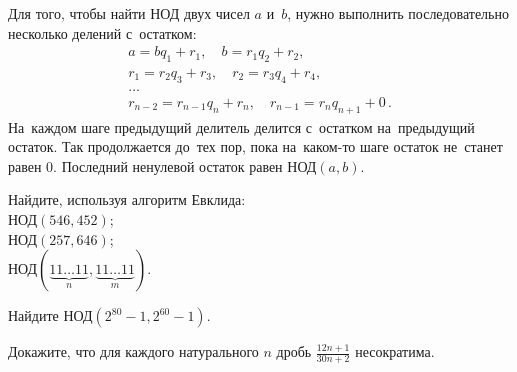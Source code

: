 Для того, чтобы найти НОД двух чисел $a$ и~$b$, нужно выполнить последовательно
несколько делений с~остатком:
\begin{gather*}
    a = b q_1 + r_1
, \quad
    b = r_1 q_2 + r_2
, \\
    r_1 = r_2 q_3 + r_3
, \quad
    r_2 = r_3 q_4 + r_4
, \\ \ldots \\
    r_{n-2} = r_{n-1} q_n + r_n
, \quad
    r_{n-1} = r_n q_{n+1} + 0
\,.\end{gather*}
На~каждом шаге предыдущий делитель делится с~остатком на~предыдущий остаток.
Так продолжается до~тех пор, пока на~каком-то шаге остаток не~станет равен 0.
Последний ненулевой остаток равен $\text{НОД}(a, b)$.

\begin{problems}

\item
Найдите, используя алгоритм Евклида:
\\
\subproblem $\text{НОД}(546, 452)$;
\\
\subproblem $\text{НОД}(257, 646)$;
\\
\subproblem
\(
    \text{НОД} (
        \underbrace{11 \ldots 11}_{n},
        \underbrace{11 \ldots 11}_{m}
    )
\).



\item
Найдите $\text{НОД}(2^{80} - 1,  2^{60} - 1)$.

\item
Докажите, что для каждого натурального $n$ дробь $\frac{12 n + 1}{30 n + 2}$
несократима.




\end{problems}
